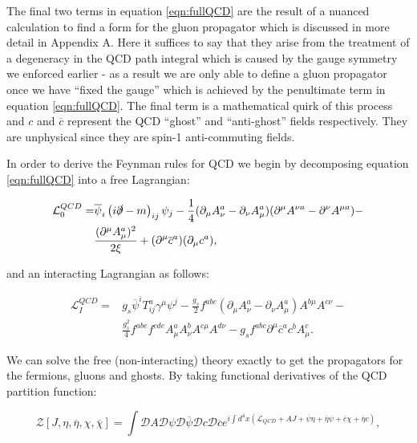 	The final two terms in equation \eqref{eqn:fullQCD} are the result of a nuanced calculation to find a form
	for the gluon propagator which is discussed in more detail in Appendix A.  Here it suffices to say that they
	arise from the treatment of a degeneracy in the QCD path integral which is caused by the gauge symmetry we
	enforced earlier - as a result we are only able to define a gluon propagator once we have ``fixed the gauge'' which
	is achieved by the penultimate term in equation \eqref{eqn:fullQCD}.  The final term is a
	mathematical quirk of this process and $c$ and $\overline{c}$ represent the QCD
	``ghost'' and ``anti-ghost'' fields respectively.  They are unphysical since they are spin-1 anti-commuting fields.

	In order to derive the Feynman rules for QCD we begin by decomposing equation \eqref{eqn:fullQCD} into a free Lagrangian:

	\begin{align*}
		\mathcal{L}_0^{QCD} =  &\overline{\psi}_i\left(i\slashed \partial-m\right)_{ij}\psi_j -
		\frac{1}{4}(\partial_{\mu}A_{\nu}^a - \partial_{\nu}A_{\mu}^a)(\partial^{\mu}A^{\nu a} - \partial^{\nu}A^{\mu a}) -\\
		&\frac{(\partial^\mu A_\mu^a)^2}{2\xi} + (\partial^\mu \overline{c}^{a})(\partial_\mu c^a),
	\end{align*}

	and an interacting Lagrangian as follows:

	\begin{align*}
		\mathcal{L}_{I}^{QCD} = &g_s\overline{\psi}^i T^a_{ij}\gamma^\mu\psi^j - \frac{g_s}{2}f^{abc}(\partial_{\mu}A^a_{\nu} -
		\partial_{\nu}A^a_{\mu})A^{b\mu}A^{c\nu}- \\ &\frac{g_s^2}{4}f^{abe}f^{cde}A^a_\mu A^b_\nu A^{c\mu}A^{d\nu} -
		g_sf^{abc}\partial^\mu \overline{c}^{a}c^bA^c_\mu.
	\end{align*}

	We can solve the free (non-interacting) theory exactly to get the propagators for the fermions, gluons
	and ghosts.  By taking functional derivatives of the QCD partition function:

	\begin{equation}
		\mathcal{Z}[J, \eta, \overline{\eta}, \chi, \overline{\chi}] = \int\mathcal{D}A\mathcal{D}\psi\mathcal{D}\overline{\psi}
		\mathcal{D}c\mathcal{D}\overline{c} e^{i\int d^4x(\mathcal{L}_{QCD} + AJ + \overline{\psi}\eta + \overline{\eta}\psi + \overline{c}\chi + \overline{\eta}c)},
	\end{equation}

